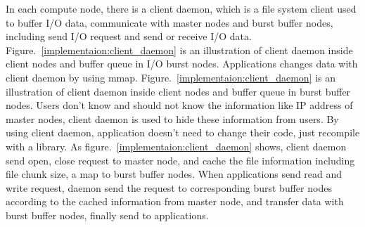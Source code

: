 In each compute node, there is a client daemon, which is a file system client used to buffer I/O
data, communicate with master nodes and burst buffer nodes, including send I/O request and send or
receive I/O data.
Figure.~\ref{implementaion:client_daemon} is an illustration of client daemon inside client nodes
and buffer queue in I/O burst nodes.
Applications changes data with client daemon by using mmap.
 Figure.~\ref{implementaion:client_daemon}
is an illustration of client daemon inside client nodes and buffer queue in burst buffer nodes.
Users don't know and should not know the information like IP address of master nodes,  client daemon
is used to hide these information from users.
By using client daemon, application doesn't need to change their code, just recompile with a
library.
As figure.~\ref{implementaion:client_daemon} shows, client daemon send open, close request to master
node, and cache the file information including file chunk size, a map to burst buffer nodes.
When applications send read and write request, daemon send the request to corresponding burst buffer nodes
according to the cached information from master node, and transfer data with burst buffer nodes, finally
send to applications.




